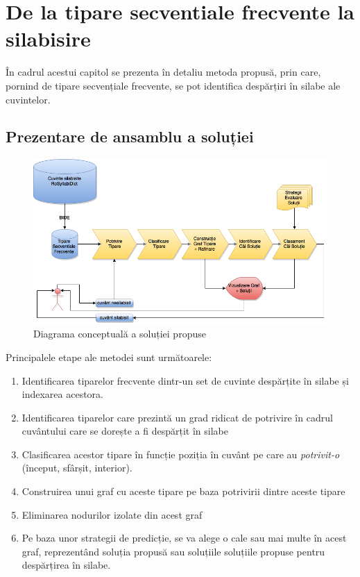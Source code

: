 \chapter{De la tipare secventiale frecvente la silabisire}
\label{cap:contributii}

În cadrul acestui capitol se prezenta în detaliu metoda propusă, prin care, pornind de tipare secvențiale frecvente, se pot identifica despărțiri în silabe ale cuvintelor.  

\section{Prezentare de ansamblu a soluției}

\begin{figure}[h]
    \centering
    \includegraphics[width=\textwidth]{figures/rosil-flow.png}
    \caption{Diagrama conceptuală a soluției propuse}
    \label{fig:rosil-flow}
\end{figure}

Principalele etape ale metodei sunt următoarele:
\begin{enumerate}
\item Identificarea tiparelor frecvente dintr-un set de cuvinte despărțite în silabe și indexarea acestora.
\item Identificarea tiparelor care prezintă un grad ridicat de potrivire în cadrul cuvântului care se dorește a fi despărțit în silabe
\item Clasificarea acestor tipare în funcție poziția în cuvânt pe care au \textit{potrivit-o} (început, sfârșit, interior).
\item Construirea unui graf cu aceste tipare pe baza potrivirii dintre aceste tipare
\item Eliminarea nodurilor izolate din acest graf
\item Pe baza unor strategii de predicție, se va alege o cale sau mai multe în acest graf, reprezentând soluția propusă sau soluțiile soluțiile propuse pentru despărțirea în silabe.
\end{enumerate}

